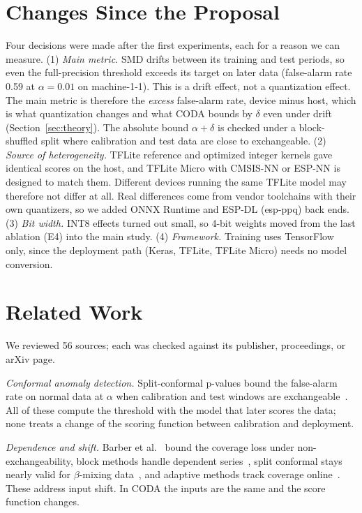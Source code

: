 \documentclass[conference]{IEEEtran}
\begin{document}
\section{Changes Since the Proposal}
Four decisions were made after the first experiments, each for a reason we can measure.
(1) \emph{Main metric.} SMD drifts between its training and test periods, so even the full-precision threshold exceeds its target on later data (false-alarm rate 0.59 at $\alpha=0.01$ on machine-1-1). This is a drift effect, not a quantization effect. The main metric is therefore the \emph{excess} false-alarm rate, device minus host, which is what quantization changes and what CODA bounds by $\delta$ even under drift (Section~\ref{sec:theory}). The absolute bound $\alpha+\delta$ is checked under a block-shuffled split where calibration and test data are close to exchangeable.
(2) \emph{Source of heterogeneity.} TFLite reference and optimized integer kernels gave identical scores on the host, and TFLite Micro with CMSIS-NN or ESP-NN is designed to match them. Different devices running the same TFLite model may therefore not differ at all. Real differences come from vendor toolchains with their own quantizers, so we added ONNX Runtime and ESP-DL (esp-ppq) back ends.
(3) \emph{Bit width.} INT8 effects turned out small, so 4-bit weights moved from the last ablation (E4) into the main study.
(4) \emph{Framework.} Training uses TensorFlow only, since the deployment path (Keras, TFLite, TFLite Micro) needs no model conversion.

\section{Related Work}
We reviewed 56 sources; each was checked against its publisher, proceedings, or arXiv page.

\emph{Conformal anomaly detection.} Split-conformal p-values bound the false-alarm rate on normal data at $\alpha$ when calibration and test windows are exchangeable~\cite{vovk2022,angelopoulos2023,bates2023,laxhammar2015}. All of these compute the threshold with the model that later scores the data; none treats a change of the scoring function between calibration and deployment.

\emph{Dependence and shift.} Barber et al.~\cite{barber2023} bound the coverage loss under non-exchangeability, block methods handle dependent series~\cite{chernozhukov2018}, split conformal stays nearly valid for $\beta$-mixing data~\cite{oliveira2024}, and adaptive methods track coverage online~\cite{gibbs2021,zaffran2022}. These address input shift. In CODA the inputs are the same and the score function changes.
\end{document}
